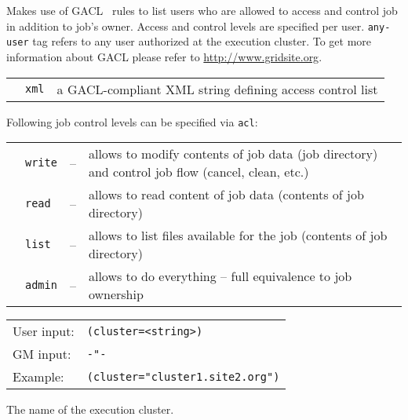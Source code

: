   Makes use of GACL~\cite{gacl} rules to list users who are allowed to
  access and control job in addition to job's owner. Access and
  control levels are specified per user. \texttt{any-user} tag refers
  to any user authorized at the execution cluster. To get more
  information about GACL please refer to \url{http://www.gridsite.org}.

  \begin{tabular}{llp{10cm}}
    \hspace*{1cm}&\texttt{xml} & a GACL-compliant XML string defining
    access control list\\
  \end{tabular}

  Following job control levels can be specified via \texttt{acl}:

  \begin{tabular}{llll}
    \hspace*{1cm}&\texttt{write}&--&\parbox[t]{11cm}{allows to modify contents of job data (job directory) and control job flow (cancel, clean, etc.)}\\
    \hspace*{1cm}&\texttt{read}&--&\parbox[t]{11cm}{allows to read content of job data
    (contents of job directory)}\\
    \hspace*{1cm}&\texttt{list}&--&\parbox[t]{11cm}{allows to list files available for
    the job (contents of job directory)}\\
    \hspace*{1cm}&\texttt{admin}&--&\parbox[t]{11cm}{allows to do everything --
    full equivalence to job ownership}\\
  \end{tabular}

  \hspace*{0.5cm}
  \begin{shaded}
  \end{shaded}
  \begin{tabular}{lp{13cm}}
    User input:&\verb#(cluster=<string>)#\\
    GM input:&\verb#-"-#\\
    Example:&\verb#(cluster="cluster1.site2.org")#\\
  \end{tabular}

  The name of the execution cluster.

